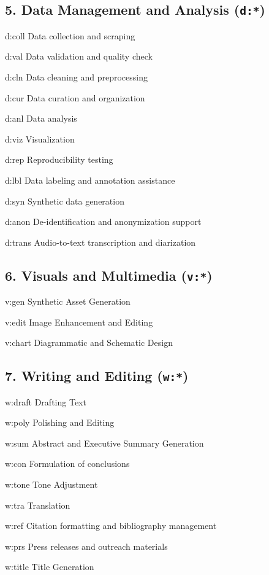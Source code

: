 \documentclass[11pt]{article}
\begin{document}
\subsection*{5. Data Management and Analysis (\texttt{d:*})}
\begin{gaikeys}
    \item[d:coll]  Data collection and scraping
    \item[d:val]   Data validation and quality check
    \item[d:cln]   Data cleaning and preprocessing
    \item[d:cur]   Data curation and organization
    \item[d:anl]   Data analysis
    \item[d:viz]   Visualization
    \item[d:rep]   Reproducibility testing
    \item[d:lbl]   Data labeling and annotation assistance
    \item[d:syn]   Synthetic data generation
    \item[d:anon]  De-identification and anonymization support
    \item[d:trans] Audio-to-text transcription and diarization
\end{gaikeys}

\subsection*{6. Visuals and Multimedia (\texttt{v:*})}
\begin{gaikeys}
    \item[v:gen]   Synthetic Asset Generation
    \item[v:edit]  Image Enhancement and Editing
    \item[v:chart] Diagrammatic and Schematic Design
\end{gaikeys}

\subsection*{7. Writing and Editing (\texttt{w:*})}
\begin{gaikeys}
    \item[w:draft] Drafting Text
    \item[w:poly]  Polishing and Editing
    \item[w:sum]   Abstract and Executive Summary Generation
    \item[w:con]   Formulation of conclusions
    \item[w:tone]  Tone Adjustment
    \item[w:tra]   Translation
    \item[w:ref]   Citation formatting and bibliography management
    \item[w:prs]   Press releases and outreach materials
    \item[w:title] Title Generation
\end{gaikeys}
\end{document}
